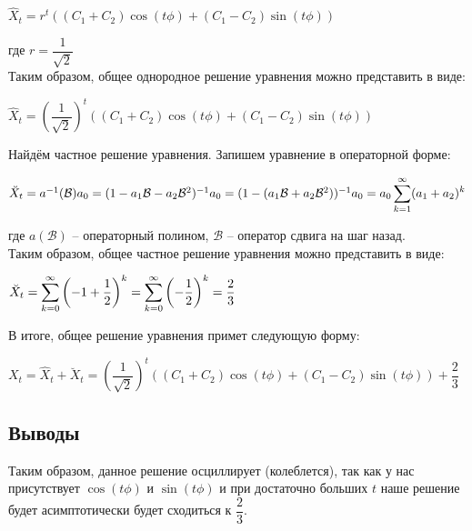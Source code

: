 \documentclass[14pt,fleqn]{extarticle}
\begin{document}
	\begin{center}
		$\hat{X}_t = r^t((C_1+C_2)\cos(t\phi)+(C_1-C_2)\sin(t\phi))$
	\end{center}
	где $r = \dfrac{1}{\sqrt{2}}$\\
	Таким образом, общее однородное решение уравнения можно представить в виде:
	\begin{center}
		$\hat{X}_t = \left(\dfrac{1}{\sqrt{2}}\right)^t((C_1+C_2)\cos(t\phi)+(C_1-C_2)\sin(t\phi))$
	\end{center}
	Найдём частное решение уравнения. Запишем уравнение в операторной форме:
	\begin{center}
		$\breve{X}_t = a^{-1}(\mathcal{B}) a_0 = (1-a_1\mathcal{B} - a_2\mathcal{B}^2)^{-1}a_0 = (1 - (a_1\mathcal{B} + a_2\mathcal{B}^2))^{-1}a_0 = a_0 \smashoperator[r]{\sum_{k=1}^{\infty}}(a_1+a_2)^k$
	\end{center}
	где $a(\mathcal{B})$ -- операторный полином, $\mathcal{B}$ -- оператор сдвига на шаг назад.\\
	Таким образом, общее частное решение уравнения можно представить в виде:
	\begin{center}
		$\breve{X}_t = \smashoperator[r]{\sum_{k=0}^{\infty}}\left(-1 + \dfrac{1}{2}\right)^k = \smashoperator[r]{\sum_{k=0}^{\infty}}\left(-\dfrac{1}{2}\right)^k = \dfrac{2}{3}$
	\end{center}
	В итоге, общее решение уравнения примет следующую форму:
	\begin{center}
		$X_t = \hat{X}_t + \breve{X}_t = \left(\dfrac{1}{\sqrt{2}}\right)^t((C_1+C_2)\cos(t\phi)+(C_1-C_2)\sin(t\phi)) + \dfrac{2}{3}$
	\end{center}
	\subsection*{Выводы}
	Таким образом, данное решение осциллирует (колеблется), так как у нас присутствует $\cos(t\phi)$ и $\sin(t\phi)$ и при достаточно больших $t$ наше решение будет асимптотически будет сходиться к $\dfrac{2}{3}$.
	
	\newpage
\end{document}
